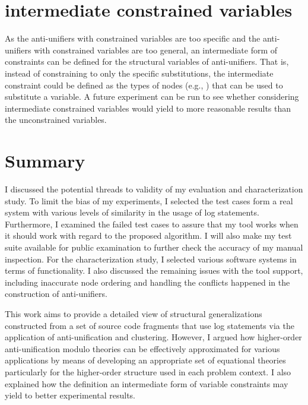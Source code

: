 \section{intermediate constrained variables}  \label{intC}

As the anti-unifiers with constrained variables are too specific and the anti-unifiers with constrained variables are too general, an intermediate form of constraints can be defined for the structural variables of anti-unifiers. That is, instead of constraining to only the specific substitutions, the intermediate constraint could be defined as the types of nodes (e.g.,  ) that can be used to substitute a variable. A future experiment can be run to see whether considering intermediate constrained variables would yield to more reasonable results than the unconstrained variables.


\section{Summary}  \label{diss-summary}
I discussed the potential threads to validity of my evaluation and characterization study. To limit the bias of my experiments, I selected the test cases form a real system with various levels of similarity in the usage of log statements. Furthermore, I examined the failed test cases to assure that my tool works when it should work with regard to the proposed algorithm. I will also make my test suite available for public examination to further check the accuracy of my manual inspection. For the characterization study, I selected various software systems in terms of functionality. I also discussed the remaining issues with the tool support, including inaccurate node ordering and handling the conflicts happened in the construction of anti-unifiers.

This work aims to provide a detailed view of structural generalizations constructed from a set of source code fragments that use log statements via the application of anti-unification and clustering. However, I argued how higher-order anti-unification modulo theories can be effectively approximated for various applications by means of developing an appropriate set of equational theories particularly for the higher-order structure used in each problem context. I also explained how the definition an intermediate form of variable constraints may yield to better experimental results.


